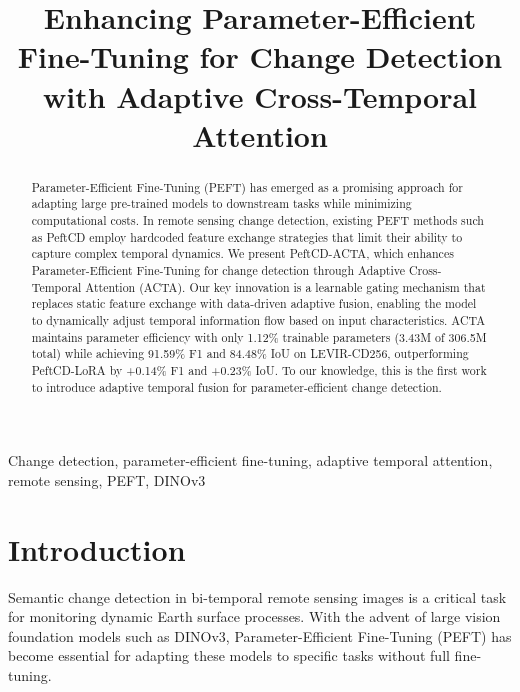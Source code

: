 \documentclass{IEEEtran}
\begin{document}
\title{Enhancing Parameter-Efficient Fine-Tuning for Change Detection with Adaptive Cross-Temporal Attention}

\author{
}

\maketitle

\begin{abstract}
Parameter-Efficient Fine-Tuning (PEFT) has emerged as a promising approach for adapting large pre-trained models to downstream tasks while minimizing computational costs. In remote sensing change detection, existing PEFT methods such as PeftCD employ hardcoded feature exchange strategies that limit their ability to capture complex temporal dynamics. We present PeftCD-ACTA, which enhances Parameter-Efficient Fine-Tuning for change detection through Adaptive Cross-Temporal Attention (ACTA). Our key innovation is a learnable gating mechanism that replaces static feature exchange with data-driven adaptive fusion, enabling the model to dynamically adjust temporal information flow based on input characteristics. ACTA maintains parameter efficiency with only 1.12\% trainable parameters (3.43M of 306.5M total) while achieving 91.59\% F1 and 84.48\% IoU on LEVIR-CD256, outperforming PeftCD-LoRA by +0.14\% F1 and +0.23\% IoU. To our knowledge, this is the first work to introduce adaptive temporal fusion for parameter-efficient change detection.
\end{abstract}

\begin{IEEEkeywords}
Change detection, parameter-efficient fine-tuning, adaptive temporal attention, remote sensing, PEFT, DINOv3
\end{IEEEkeywords}

\section{Introduction}

Semantic change detection in bi-temporal remote sensing images is a critical task for monitoring dynamic Earth surface processes. With the advent of large vision foundation models such as DINOv3, Parameter-Efficient Fine-Tuning (PEFT) has become essential for adapting these models to specific tasks without full fine-tuning.
\end{document}
